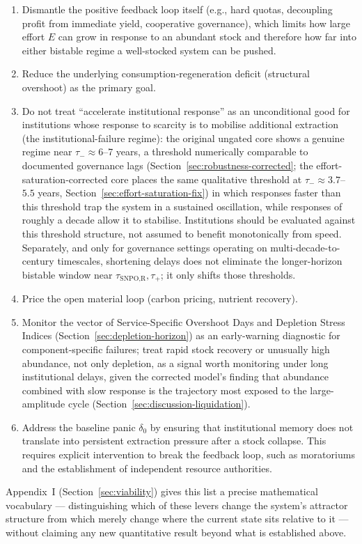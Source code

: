\documentclass[twocolumn,10pt]{article}
\begin{document}
\begin{enumerate}
\item Dismantle the positive feedback loop itself (e.g., hard quotas, decoupling profit from immediate yield, cooperative governance), which limits how large effort $E$ can grow in response to an abundant stock and therefore how far into either bistable regime a well-stocked system can be pushed.
\item Reduce the underlying consumption-regeneration deficit (structural overshoot) as the primary goal.
\item Do not treat ``accelerate institutional response'' as an unconditional good for institutions whose response to scarcity is to mobilise additional extraction (the institutional-failure regime): the original ungated core shows a genuine regime near $\tau_-\approx6$--7 years, a threshold numerically comparable to documented governance lags (Section~\ref{sec:robustness-corrected}; the effort-saturation-corrected core places the same qualitative threshold at $\tau_-\approx3.7$--$5.5$ years, Section~\ref{sec:effort-saturation-fix}) in which responses faster than this threshold trap the system in a sustained oscillation, while responses of roughly a decade allow it to stabilise. Institutions should be evaluated against this threshold structure, not assumed to benefit monotonically from speed. Separately, and only for governance settings operating on multi-decade-to-century timescales, shortening delays does not eliminate the longer-horizon bistable window near $\tau_{\text{SNPO,R}},\tau_+$; it only shifts those thresholds.
\item Price the open material loop (carbon pricing, nutrient recovery).
\item Monitor the vector of Service-Specific Overshoot Days and Depletion Stress Indices (Section~\ref{sec:depletion-horizon}) as an early-warning diagnostic for component-specific failures; treat rapid stock recovery or unusually high abundance, not only depletion, as a signal worth monitoring under long institutional delays, given the corrected model's finding that abundance combined with slow response is the trajectory most exposed to the large-amplitude cycle (Section~\ref{sec:discussion-liquidation}).
\item Address the baseline panic \(\delta_0\) by ensuring that institutional memory does not translate into persistent extraction pressure after a stock collapse. This requires explicit intervention to break the feedback loop, such as moratoriums and the establishment of independent resource authorities.
\end{enumerate}
Appendix~I (Section~\ref{sec:viability}) gives this list a precise mathematical vocabulary — distinguishing which of these levers change the system's attractor structure from which merely change where the current state sits relative to it — without claiming any new quantitative result beyond what is established above.
\end{document}
